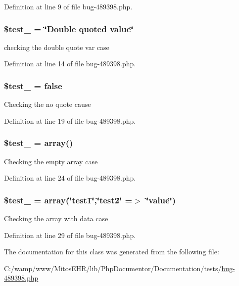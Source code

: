 \-Definition at line 9 of file bug-\/489398.\-php.

\hypertarget{classbug__489398_a3afb152bed5fe9785df5eb7d57950179}{
\subsubsection[{\$test\-\_\-02}]{\setlength{\rightskip}{0pt plus 5cm}\$test\-\_ = \char`\"{}\-Double quoted value\char`\"{}}}\label{classbug__489398_a3afb152bed5fe9785df5eb7d57950179}
checking the double quote var case 

\-Definition at line 14 of file bug-\/489398.\-php.

\hypertarget{classbug__489398_a04aab10fb3c4b687c2529d8aa36c926d}{
\subsubsection[{\$test\-\_\-03}]{\setlength{\rightskip}{0pt plus 5cm}\$test\-\_ = false}}\label{classbug__489398_a04aab10fb3c4b687c2529d8aa36c926d}
\-Checking the no quote cause 

\-Definition at line 19 of file bug-\/489398.\-php.

\hypertarget{classbug__489398_ab4f9cd222b2aa62fdf800cb3ccabbf24}{
\subsubsection[{\$test\-\_\-04}]{\setlength{\rightskip}{0pt plus 5cm}\$test\-\_ = array()}}\label{classbug__489398_ab4f9cd222b2aa62fdf800cb3ccabbf24}
\-Checking the empty array case 

\-Definition at line 24 of file bug-\/489398.\-php.

\hypertarget{classbug__489398_a0acf689202cf618890955ac1dc66ff95}{
\subsubsection[{\$test\-\_\-05}]{\setlength{\rightskip}{0pt plus 5cm}\$test\-\_ = array(\char`\"{}test1\char`\"{},\char`\"{}{\bf test2}\char`\"{} =$>$ \char`\"{}value\char`\"{})}}\label{classbug__489398_a0acf689202cf618890955ac1dc66ff95}
\-Checking the array with data case 

\-Definition at line 29 of file bug-\/489398.\-php.



\-The documentation for this class was generated from the following file\-:\begin{DoxyCompactItemize}
\item 
\-C\-:/wamp/www/\-Mitos\-E\-H\-R/lib/\-Php\-Documentor/\-Documentation/tests/\hyperlink{bug-489398_8php}{bug-\/489398.\-php}\end{DoxyCompactItemize}
